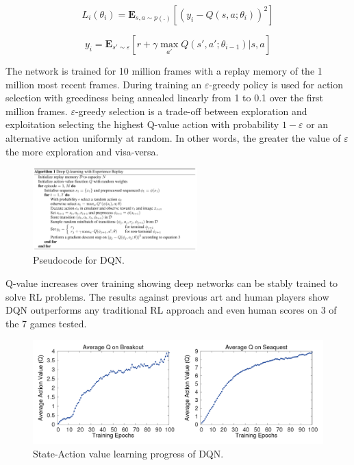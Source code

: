 \documentclass[10pt,journal,compsoc]{IEEEtran}
\begin{document}
\begin{equation}
\label{loss_func}
L_i(\theta_i) = \mathbf{E}_{s,a\sim p(.)} [(y_i -  Q(s,a;\theta_i))^2]
\end{equation}

\begin{equation}
\label{target_func}
y_i = \mathbf{E}_{s'\sim\varepsilon} [r + \gamma \max_{a'} Q(s',a';\theta_{i-1})|s,a]
\end{equation}

The network is trained for 10 million frames with a replay memory of the 1 million most recent frames. During training an $\varepsilon$-greedy policy is used for action selection with greediness being annealed linearly from 1 to 0.1 over the first million frames. $\varepsilon$-greedy selection is a trade-off between exploration and exploitation selecting the highest Q-value action with probability \begin{math}1-\varepsilon\end{math} or an alternative action uniformly at random. In other words, the greater the value of $\varepsilon$ the more exploration and visa-versa.  

\begin{figure}[!h]
\centering
\includegraphics[width=2.5in]{dqn_pseudo}
\caption{Pseudocode for DQN.}
\label{dqn_pseudo}
\end{figure}

Q-value increases over training showing deep networks can be stably trained to solve RL problems. The results against previous art and human players show DQN outperforms any traditional RL approach and even human scores on 3 of the 7 games tested.

\begin{figure}[!h]
\centering
\includegraphics[width=\linewidth]{dqn_learning}
\caption{State-Action value learning progress of DQN.}
\label{dqn_learning}
\end{figure}
\end{document}
